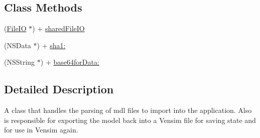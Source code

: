 \subsection*{Class Methods}
\begin{DoxyCompactItemize}
\item 
(\hyperlink{interface_file_i_o}{File\-I\-O} $\ast$) + \hyperlink{interface_file_i_o_a010550b3de2e660a2a14d4dce2990078}{shared\-File\-I\-O}
\item 
(N\-S\-Data $\ast$) + \hyperlink{interface_file_i_o_ac570de2e8f37bc126a9f9536f34bc09d}{sha1\-:}
\item 
(N\-S\-String $\ast$) + \hyperlink{interface_file_i_o_a3e844772cd8f89ba85d4bd369a093fd8}{base64for\-Data\-:}
\end{DoxyCompactItemize}


\subsection{Detailed Description}
A class that handles the parsing of mdl files to import into the application. Also is responsible for exporting the model back into a Vensim file for saving state and for use in Vensim again. 

